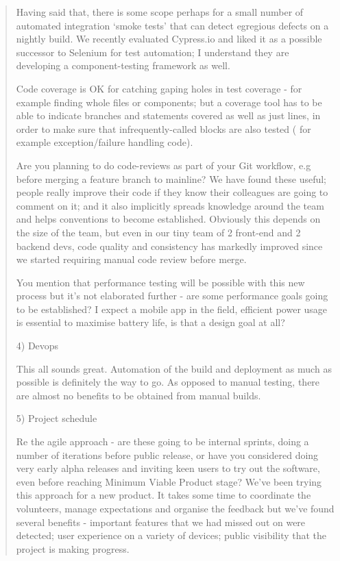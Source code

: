 \documentclass{faims3_report}
\begin{document}
\begin{quote}
Having said that, there is some scope perhaps for a small number of
  automated integration `smoke tests' that can detect egregious defects
  on a nightly build. We recently evaluated Cypress.io and liked it as a
  possible successor to Selenium for test automation; I understand they
  are developing a component-testing framework as well.
 
Code coverage is OK for catching gaping holes in test coverage - for
  example finding whole files or components; but a coverage tool has to
  be able to indicate branches and statements covered as well as just
  lines, in order to make sure that infrequently-called blocks are also
  tested ( for example exception/failure handling code).
 
Are you planning to do code-reviews as part of your Git workflow, e.g
  before merging a feature branch to mainline? We have found these
  useful; people really improve their code if they know their colleagues
  are going to comment on it; and it also implicitly spreads knowledge
  around the team and helps conventions to become established. Obviously
  this depends on the size of the team, but even in our tiny team of 2
  front-end and 2 backend devs, code quality and consistency has
  markedly improved since we started requiring manual code review before
  merge.
 
You mention that performance testing will be possible with this new
  process but it's not elaborated further - are some performance goals
  going to be established? I expect a mobile app in the field, efficient
  power usage is essential to maximise battery life, is that a design
  goal at all?
 

4) Devops

This all sounds great. Automation of the build and deployment as much as
possible is definitely the way to go. As opposed to manual testing,
there are almost no benefits to be obtained from manual builds.

5) Project schedule

Re the agile approach - are these going to be internal sprints, doing a
number of iterations before public release, or have you considered doing
very early alpha releases and inviting keen users to try out the
software, even before reaching Minimum Viable Product stage? We've been
trying this approach for a new product. It takes some time to coordinate
the volunteers, manage expectations and organise the feedback but we've
found several benefits - important features that we had missed out on
were detected; user experience on a variety of devices; public
visibility that the project is making progress.


\end{quote}
\end{document}
